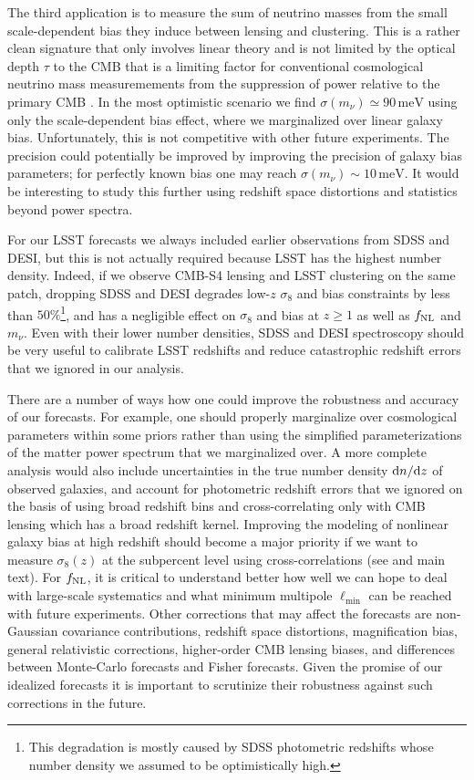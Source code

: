 \documentclass[prd,superscriptaddress,floatfix,notitlepage,nofootinbib,reprint]{revtex4-1} %
\begin{document}
The third application is to measure the sum of neutrino masses from the small scale-dependent bias they induce between lensing and clustering.
This is a rather clean signature that only involves linear theory and is not limited by the optical depth $\tau$ to the CMB that is a limiting factor for conventional cosmological neutrino mass measuremements from the suppression of power relative to the primary CMB \cite{Allison1509}.
In the most optimistic scenario we find $\sigma(m_\nu)\simeq 90\,\mathrm{meV}$ using only the scale-dependent bias effect, where we marginalized over linear galaxy bias.
Unfortunately, this is not competitive with other future experiments.
The precision could potentially be improved by improving the precision of galaxy bias parameters; for perfectly known bias one may reach $\sigma(m_\nu)\sim 10\,\mathrm{meV}$.
It would be interesting to study this further using redshift space distortions and statistics beyond power spectra.

For our LSST forecasts we always included earlier observations from SDSS and DESI, but this is not actually required because LSST has the highest number density.
Indeed, if we observe CMB-S4 lensing and LSST clustering on the same patch, dropping SDSS and DESI degrades low-$z$ $\sigma_8$ and bias constraints by less than $50\%$\footnote{This degradation is mostly caused by SDSS photometric redshifts whose number density we assumed to be optimistically high.}, and has a negligible effect on $\sigma_8$ and bias at $z\ge 1$ as well as ${f_\mathrm{NL}}$ and $m_\nu$.
Even with their lower number densities, SDSS and DESI spectroscopy should be very useful to calibrate LSST redshifts and reduce catastrophic redshift errors that we ignored in our analysis.

There are a number of ways how one could improve the robustness and accuracy of our forecasts.
For example, one should properly marginalize over cosmological parameters within some priors rather than using the simplified parameterizations of the matter power spectrum that we marginalized over.
A more complete analysis would also include uncertainties in the true number density $\mathrm{d} n/\mathrm{d} z$ of observed galaxies, and account for photometric redshift errors that we ignored on the basis of using broad redshift bins and cross-correlating only with CMB lensing which has a broad redshift kernel.
Improving the modeling of nonlinear galaxy bias at high redshift should become a major priority if we want to measure $\sigma_8(z)$ at the subpercent level using cross-correlations (see \cite{Modi1706} and main text).
For ${f_\mathrm{NL}}$, it is critical to understand better how well we can hope to deal with large-scale systematics and what minimum multipole $\ell_\mathrm{min}$ can be reached with future experiments.
Other corrections that may affect the forecasts are non-Gaussian covariance contributions, redshift space distortions, magnification bias, general relativistic corrections, higher-order CMB lensing biases, and differences between Monte-Carlo forecasts and Fisher forecasts.  
Given the promise of our idealized forecasts it is important to scrutinize their robustness against such corrections in the future.
\end{document}
